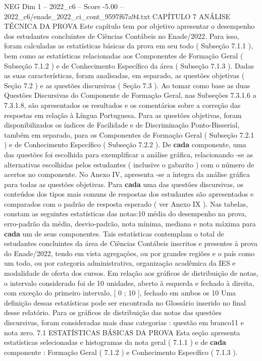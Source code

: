 \begin{textsample}{NEG Dim 1 – 2022\_c6 – Score -5.00 – 2022\_c6/enade\_2022\_ci\_cont\_9597f67a94.txt}  \label{ex:f1_neg_187}
CAPÍTULO 7 ANÁLISE TÉCNICA DA PROVA Este capítulo tem por objetivo apresentar o desempenho dos estudantes concluintes de Ciências Contábeis no Enade/2022.
Para isso, foram calculadas as estatísticas básicas da prova em seu todo ( Subseção 7.1.1 ), bem como as estatísticas relacionadas aos Componentes de Formação Geral ( Subseção 7.1.2 ) e de Conhecimento Específico da área ( Subseção 7.1.3 ).
Dadas as suas características, foram analisadas, em separado, as questões objetivas ( Seção 7.2 ) e as questões discursivas ( Seção 7.3 ).
Ao tomar como base as duas Questões Discursivas do Componente de Formação Geral, nas Subseções 7.3.1.6 a 7.3.1.8, são apresentados os resultados e os comentários sobre a correção das respostas em relação à Língua Portuguesa.
Para as questões objetivas, foram disponibilizados os índices de Facilidade e de Discriminação Ponto-Bisserial, também em separado, para os Componentes de Formação Geral ( Subseção 7.2.1 ) e de Conhecimento Específico ( Subseção 7.2.2 ).
De \textbf{cada} componente, uma das questões foi escolhida para exemplificar a análise gráfica, relacionando -se as alternativas escolhidas pelos estudantes ( inclusive o gabarito ) com o número de acertos no componente.
No Anexo IV, apresenta -se a íntegra da análise gráfica para todas as questões objetivas.
Para \textbf{cada} uma das questões discursivas, os conteúdos dos tipos mais comuns de respostas dos estudantes são apresentados e comparados com o padrão de resposta esperado ( ver Anexo IX ).
Nas tabelas, constam as seguintes estatísticas das notas:10 média do desempenho na prova, erro-padrão da média, desvio-padrão, nota mínima, mediana e nota máxima para \textbf{cada} um de seus componentes.
Tais estatísticas contemplam o total de estudantes concluintes da área de Ciências Contábeis inscritos e presentes à prova do Enade/2022, tendo em vista agregações, ou por grandes regiões e o país como um todo, ou por categoria administrativa, organização acadêmica da IES e modalidade de oferta dos cursos.
Em relação aos gráficos de distribuição de notas, o intervalo considerado foi de 10 unidades, aberto à esquerda e fechado à direita, com exceção do primeiro intervalo, [ 0 ; 10 ], fechado em ambos os 10 Uma definição dessas estatísticas pode ser encontrada no Glossário inserido no final desse relatório.
Para os gráficos de distribuição das notas das questões discursivas, foram consideradas mais duas categorias : questão em branco11 e nota zero. 7.1 ESTATÍSTICAS BÁSICAS DA PROVA Esta seção apresenta estatísticas selecionadas e histogramas da nota geral ( 7.1.1 ) e de \textbf{cada} componente : Formação Geral ( 7.1.2 ) e Conhecimento Específico ( 7.1.3 ).

\end{textsample}
